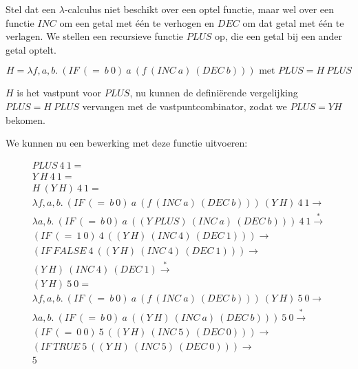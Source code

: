 Stel dat een $\lambda$-calculus niet beschikt over een optel functie, maar wel over een functie $INC$ om een getal met \'e\'en te verhogen en $DEC$ om dat getal met \'e\'en te verlagen. We stellen een recursieve functie $PLUS$ op, die een getal bij een ander getal optelt.

\begin{equation*}
  H = \lambda f,a,b.\ (IF\ (=\ b\ 0)\ a\ (f\ (INC\ a)\ (DEC\ b))) \text{ met } PLUS = H\ PLUS
\end{equation*}

$H$ is het vastpunt voor $PLUS$, nu kunnen de defini\"erende vergelijking $PLUS = H\ PLUS$ vervangen met de vastpuntcombinator, zodat we $PLUS = Y H$ bekomen.

We kunnen nu een bewerking met deze functie uitvoeren:

\begin{equation*}
\begin{aligned}
PLUS\ 4\ 1 = \\
Y\ H\ 4\ 1 = \\
H\ (Y\ H)\ 4\ 1 = \\
\lambda f,a,b.\ (IF\ (=\ b\ 0)\ a\ (f\ (INC\ a)\ (DEC\ b)))\ (Y\ H)\ 4\ 1 \longrightarrow \\
\lambda a,b.\ (IF\ (=\ b\ 0)\ a\ ((Y\ PLUS)\ (INC\ a)\ (DEC\ b)))\ 4\ 1 \stackrel{*}{\longrightarrow} \\
(IF\ (=\ 1\ 0)\ 4\ ((Y\ H)\ (INC\ 4)\ (DEC\ 1))) \longrightarrow \\
(IF\ FALSE\ 4\ ((Y\ H)\ (INC\ 4)\ (DEC\ 1))) \longrightarrow \\
(Y\ H)\ (INC\ 4)\ (DEC\ 1) \stackrel{*}{\longrightarrow} \\
(Y\ H)\ 5\ 0 = \\
\lambda f,a,b.\ (IF\ (=\ b\ 0)\ a\ (f\ (INC\ a)\ (DEC\ b)))\ (Y\ H)\ 5\ 0 \longrightarrow \\
\lambda a,b.\ (IF\ (=\ b\ 0)\ a\ ((Y\ H)\ (INC\ a)\ (DEC\ b)))\ 5\ 0 \stackrel{*}{\longrightarrow} \\
(IF\ (=\ 0\ 0)\ 5\ ((Y\ H)\ (INC\ 5)\ (DEC\ 0))) \longrightarrow \\
(IF\ TRUE\ 5\ ((Y\ H)\ (INC\ 5)\ (DEC\ 0))) \longrightarrow \\
5
\end{aligned}
\end{equation*}